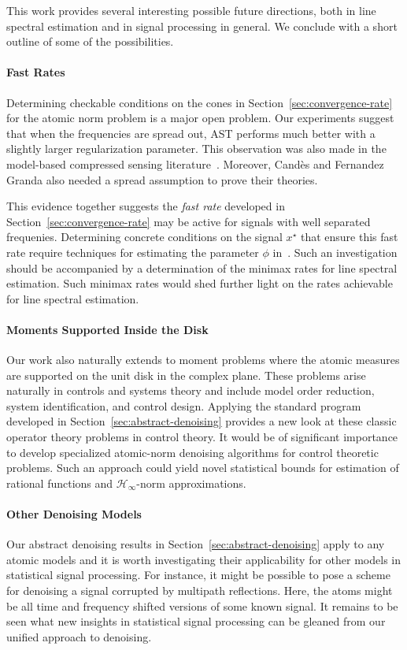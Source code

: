 This work provides several interesting possible future directions, both in line
spectral estimation and in signal processing in general. We conclude with a
short outline of some of the possibilities.

\paragraph{Fast Rates} Determining checkable conditions on the cones in
Section~\ref{sec:convergence-rate} for the atomic norm problem is a major open
problem. Our experiments suggest that when the frequencies are spread out, AST
performs much better with a slightly larger regularization parameter.  This observation was also made in the model-based compressed sensing literature~\cite{duartescs}.  Moreover, Cand\`es and Fernandez Granda also needed a spread assumption to prove their theories.

This evidence together suggests the \emph{fast rate} developed in Section~\ref{sec:convergence-rate} may be active for signals with well separated frequenies. Determining concrete conditions on the signal $x^\star$ that ensure this fast rate require techniques for estimating the parameter $\phi$ in~. Such an
investigation should be accompanied by a determination of the minimax rates for
line spectral estimation. Such minimax rates would shed further light on the
rates achievable for line spectral estimation.

\paragraph{Moments Supported Inside the Disk} Our work also naturally extends
to moment problems where the atomic measures are supported on the unit disk in
the complex plane. These problems arise naturally in controls and systems
theory and include model order reduction, system identification, and control
design. Applying the standard program developed in
Section~\ref{sec:abstract-denoising} provides a new look at these classic
operator theory problems in control theory. It would be of significant
importance to develop specialized atomic-norm denoising algorithms for control
theoretic problems. Such an approach could yield novel statistical bounds for
estimation of rational functions and $\mathcal{H}_\infty$-norm approximations.

\paragraph{Other Denoising Models} Our abstract denoising results in
Section~\ref{sec:abstract-denoising} apply to any atomic models and it is worth
investigating their applicability for other models in statistical signal
processing. For instance, it might be possible to pose a scheme for denoising a
signal corrupted by multipath reflections. Here, the atoms might be all time
and frequency shifted versions of some known signal. It remains to be seen what
new insights in statistical signal processing can be gleaned from our unified
approach to denoising.

